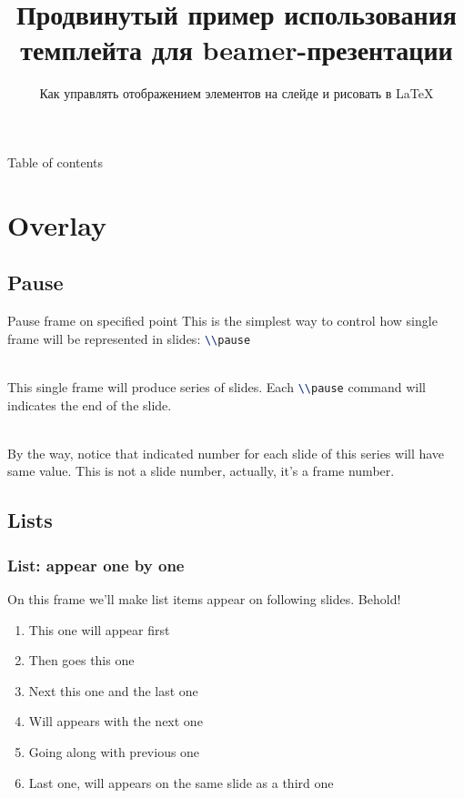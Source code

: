 
\title[bash]{Продвинутый пример использования темплейта для beamer-презентации}
\subtitle{Как управлять отображением элементов на слейде и рисовать в \LaTeX}



\begin{frame}
	\titlepage
\end{frame}

\begin{frame}{Table of contents}
	\tableofcontents
\end{frame}




\section{Overlay}
\subsection{Pause}
\begin{frame}{Pause frame on specified point}
    This is the simplest way to control how single frame will be represented in slides: \lstinline[language=tex]{\\pause}\\~\\\pause

    This single frame will produce series of slides. Each \lstinline[language=tex]{\\pause} command will indicates the end of the slide.\\~\\\pause

    By the way, notice that indicated number for each slide of this series will have same value. This is not a slide number, actually, it's a frame number. 
\end{frame}

\subsection{Lists}
\begin{frame}
    \frametitle{List: appear one by one}
    On this frame we'll make list items appear on following slides. Behold!
    \begin{enumerate}
	\item<1-> This one will appear first
	\item<2-> Then goes this one
	\item<3-> Next this one and the last one
	\item<4-> Will appears with the next one
	\item<4-> Going along with previous one
	\item<3-> Last one, will appears on the same slide as a third one
    \end{enumerate}
\end{frame}

